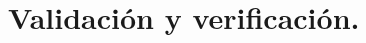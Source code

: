 \chapter{Validación y verificación.}
\label{cap:capitulo6}

\clearpage{\cleardoublepage}
\clearpage{\pagestyle{empty}\cleardoublepage}

